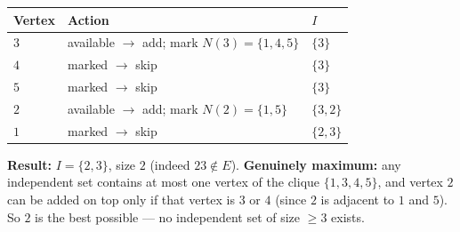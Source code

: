 \begin{center}
\begin{tabular}{@{}lll@{}}
\toprule
Vertex & Action & $I$ \\
\midrule
$3$ & available $\to$ add; mark $N(3)=\{1,4,5\}$ & $\{3\}$ \\
$4$ & marked $\to$ skip & $\{3\}$ \\
$5$ & marked $\to$ skip & $\{3\}$ \\
$2$ & available $\to$ add; mark $N(2)=\{1,5\}$ & $\{3,2\}$ \\
$1$ & marked $\to$ skip & $\{2,3\}$ \\
\bottomrule
\end{tabular}
\end{center}

\noindent\textbf{Result:} $I=\{2,3\}$, size $2$ (indeed $23\notin E$). \textbf{Genuinely
maximum:} any independent set contains at most one vertex of the clique $\{1,3,4,5\}$, and vertex
$2$ can be added on top only if that vertex is $3$ or $4$ (since $2$ is adjacent to $1$ and $5$).
So $2$ is the best possible --- no independent set of size $\ge3$ exists.

